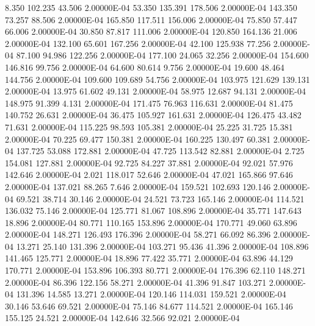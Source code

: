      8.350   102.235    43.506  2.00000E-04
    53.350   135.391   178.506  2.00000E-04
   143.350    73.257    88.506  2.00000E-04
   165.850   117.511   156.006  2.00000E-04
    75.850    57.447    66.006  2.00000E-04
    30.850    87.817   111.006  2.00000E-04
   120.850   164.136    21.006  2.00000E-04
   132.100    65.601   167.256  2.00000E-04
    42.100   125.938    77.256  2.00000E-04
    87.100    94.986   122.256  2.00000E-04
   177.100    24.065    32.256  2.00000E-04
   154.600   146.816    99.756  2.00000E-04
    64.600    80.614     9.756  2.00000E-04
    19.600    48.464   144.756  2.00000E-04
   109.600   109.689    54.756  2.00000E-04
   103.975   121.629   139.131  2.00000E-04
    13.975    61.602    49.131  2.00000E-04
    58.975    12.687    94.131  2.00000E-04
   148.975    91.399     4.131  2.00000E-04
   171.475    76.963   116.631  2.00000E-04
    81.475   140.752    26.631  2.00000E-04
    36.475   105.927   161.631  2.00000E-04
   126.475    43.482    71.631  2.00000E-04
   115.225    98.593   105.381  2.00000E-04
    25.225    31.725    15.381  2.00000E-04
    70.225    69.477   150.381  2.00000E-04
   160.225   130.497    60.381  2.00000E-04
   137.725    53.088   172.881  2.00000E-04
    47.725   113.542    82.881  2.00000E-04
     2.725   154.081   127.881  2.00000E-04
    92.725    84.227    37.881  2.00000E-04
    92.021    57.976   142.646  2.00000E-04
     2.021   118.017    52.646  2.00000E-04
    47.021   165.866    97.646  2.00000E-04
   137.021    88.265     7.646  2.00000E-04
   159.521   102.693   120.146  2.00000E-04
    69.521    38.714    30.146  2.00000E-04
    24.521    73.723   165.146  2.00000E-04
   114.521   136.032    75.146  2.00000E-04
   125.771    81.067   108.896  2.00000E-04
    35.771   147.643    18.896  2.00000E-04
    80.771   110.165   153.896  2.00000E-04
   170.771    49.060    63.896  2.00000E-04
   148.271   126.493   176.396  2.00000E-04
    58.271    66.092    86.396  2.00000E-04
    13.271    25.140   131.396  2.00000E-04
   103.271    95.436    41.396  2.00000E-04
   108.896   141.465   125.771  2.00000E-04
    18.896    77.422    35.771  2.00000E-04
    63.896    44.129   170.771  2.00000E-04
   153.896   106.393    80.771  2.00000E-04
   176.396    62.110   148.271  2.00000E-04
    86.396   122.156    58.271  2.00000E-04
    41.396    91.847   103.271  2.00000E-04
   131.396    14.585    13.271  2.00000E-04
   120.146   114.031   159.521  2.00000E-04
    30.146    53.646    69.521  2.00000E-04
    75.146    84.677   114.521  2.00000E-04
   165.146   155.125    24.521  2.00000E-04
   142.646    32.566    92.021  2.00000E-04
